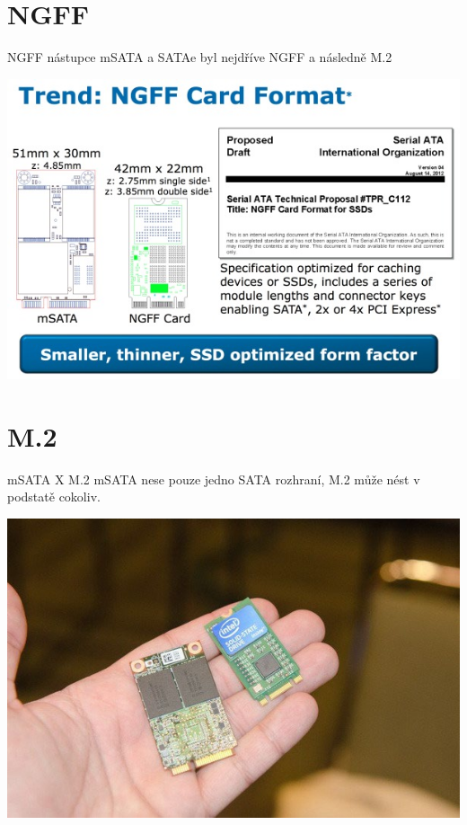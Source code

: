 \documentclass[aspectratio=43]{beamer}
\begin{document}
\section{NGFF}
\begin{frame}{NGFF}
	nástupce mSATA a SATAe byl nejdříve NGFF a následně M.2
	\begin{center}
		\includegraphics[width=0.8\linewidth]{extrahovane_obrazky/img_2_page22_0.png}
	\end{center}
	
\end{frame}

\section{M.2}
\begin{frame}{mSATA X M.2}
	mSATA nese pouze jedno SATA rozhraní, M.2 může nést v podstatě cokoliv.
	\begin{center}
		\includegraphics[width=0.9\linewidth]{extrahovane_obrazky/img_2_page23_0.jpeg}
	\end{center}
	
\end{frame}
\end{document}
